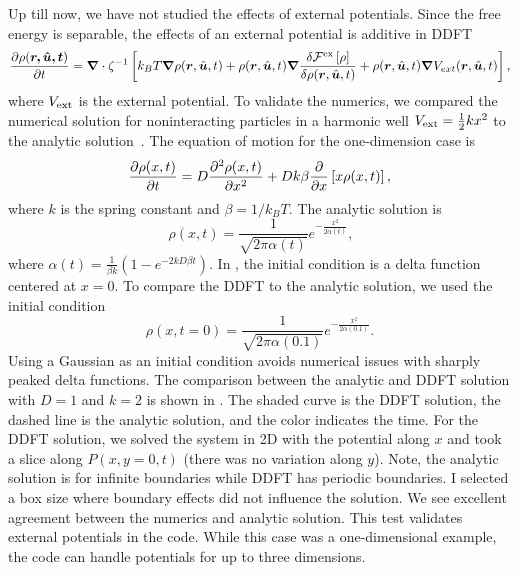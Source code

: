 Up till now, we have not studied the effects of external potentials. Since the
free energy is separable, the effects of an external potential is additive in
DDFT~\cite{archer_dynamical_04}
%
\begin{align}
  \frac{\partial\rho(\bm{r,\hat{\bm{u}},t})}{\partial t} = 
  \bm{\nabla}  \cdot \zeta^{-1} \left[  
    k_B T \bm{\nabla} \rho(\bm{r},\hat{\bm{u}},t) 
    + \rho(\bm{r},\hat{\bm{u}},t) \bm{\nabla}
    \frac{\delta \mathcal{F}^{\mathrm{ex}} \left[ \rho \right]}
  {\delta \rho(\bm{r},\hat{\bm{u}}, t ) } 
  +\rho(\bm{r},\hat{\bm{u}}, t )\bm{\nabla} V_{ext}(\bm{r}, \hat{\bm{u}}, t)
\right],
\end{align}
%
where $V_{\mathrm{ext}}$ is the external potential.  To validate the numerics, we
compared the numerical solution for noninteracting particles in a harmonic well
$V_{\mathrm{ext}} = \frac{1}{2}k x^2$ to the analytic solution~\cite{doi_theory_88}.
The equation of motion for the one-dimension case is
%
\begin{align}
  \label{eqn:harmonic}
  \frac{\partial\rho(x, t)}{\partial t} = 
  D \frac{\partial^2 \rho(x,t)}{\partial x ^2}   + 
  Dk\beta \frac{\partial}{\partial x} \left[ x \rho(x, t ) \right],
\end{align}
%
where $k$ is the spring constant and $\beta = 1/k_B T$. The analytic solution is 
%
\begin{equation}~\label{eqn:analytic_harm}
  \rho(x,t) = \frac{1}{\sqrt{2\pi \alpha(t)}}
e^{-\frac{x^2}{2 \alpha(t)}},
\end{equation}
%
where $ \alpha(t) = \frac{1}{\beta k}(1-e^{-2kD\beta t})$.
In , the initial condition is a delta function centered
at $x=0$. To compare the DDFT to the analytic solution, we used the initial
condition
%
\begin{equation}
  \rho(x,t=0) = \frac{1}{\sqrt{2\pi \alpha(0.1)}}
e^{-\frac{x^2}{2 \alpha(0.1)}}.
\end{equation}
%
Using a Gaussian as an initial condition avoids numerical issues with sharply
peaked delta functions.  The comparison between the analytic and DDFT solution
with $D=1$ and $k=2$ is shown in . The shaded curve is the
DDFT solution, the dashed line is the analytic solution, and the color indicates
the time. For the DDFT solution, we solved the system in 2D with the potential
along $x$ and took a slice along $P(x,y=0,t)$ (there was no variation along
$y$). Note, the analytic solution is for infinite boundaries while DDFT has
periodic boundaries. I selected a box size where boundary effects did not
influence the solution. We see excellent agreement between the numerics and
analytic solution. This test validates external potentials in the code. While
this case was a one-dimensional example, the code can handle potentials for up
to three dimensions.
